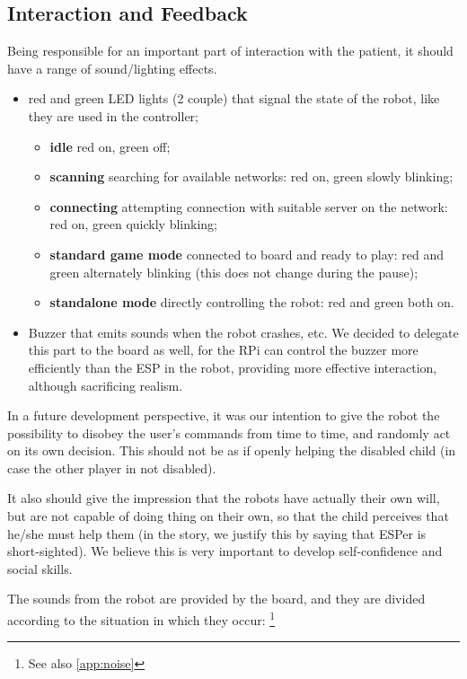 \documentclass[a4paper,twoside]{book}
\begin{document}
\subsection{Interaction and Feedback}

Being responsible for an important part of interaction with the patient, it should have a range of sound/lighting effects.
\begin{itemize}
\item red and green LED lights (2 couple) that signal the state of the robot, like they are used in the controller;
	\begin{itemize}
	\item \textbf{idle} red on, green off;
	\item \textbf{scanning} searching for available networks: red on, green slowly blinking;
	\item \textbf{connecting} attempting connection with suitable server on the network: red on, green quickly blinking;
	\item \textbf{standard game mode} connected to board and ready to play: red and green alternately blinking (this does not change during the pause);
	\item \textbf{standalone mode} directly controlling the robot: red and green both on.
	\end{itemize}
\item Buzzer that emits sounds when the robot crashes, etc. We decided to delegate this part to the board as well, for the RPi can control the buzzer more efficiently than the ESP in the robot, providing more effective interaction, although sacrificing realism.
\end{itemize}
In a future development perspective, it was our intention to give the robot the possibility to disobey the user's commands from time to time, and randomly act on its own decision. This should not be as if openly helping the disabled child (in case the other player in not disabled).

It also should give the impression that the robots have actually their own will, but are not capable of doing thing on their own, so that the child perceives that he/she must help them (in the story, we justify this by saying that ESPer is short-sighted). We believe this is very important to develop self-confidence and social skills.

The sounds from the robot are provided by the board, and they are divided according to the situation in which they occur:
\footnote{See also \autoref{app:noise}}
\end{document}
